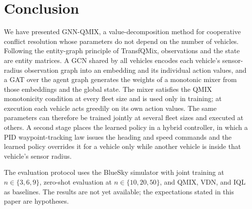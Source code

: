 \section{Conclusion}
\label{sec:conclusion}
We have presented GNN-QMIX, a value-decomposition method for cooperative conflict
resolution whose parameters do not depend on the number of vehicles. Following the
entity-graph principle of TransfQMix, observations and the state are entity matrices. A
GCN shared by all vehicles encodes each vehicle's sensor-radius observation graph into an
embedding and its individual action values, and a GAT over the agent graph generates the
weights of a monotonic mixer from those embeddings and the global state. The mixer
satisfies the QMIX monotonicity condition at every fleet size and is used only in training;
at execution each vehicle acts greedily on its own action values. The same parameters can
therefore be trained jointly at several fleet sizes and executed at others. A second stage
places the learned policy in a hybrid controller, in which a PID waypoint-tracking law
issues the heading and speed commands and the learned policy overrides it for a vehicle
only while another vehicle is inside that vehicle's sensor radius.

The evaluation protocol uses the BlueSky simulator with joint training at $n\in\{3,6,9\}$,
zero-shot evaluation at $n\in\{10,20,50\}$, and QMIX, VDN, and IQL as baselines. The results
are not yet available; the expectations stated in this paper are hypotheses.

